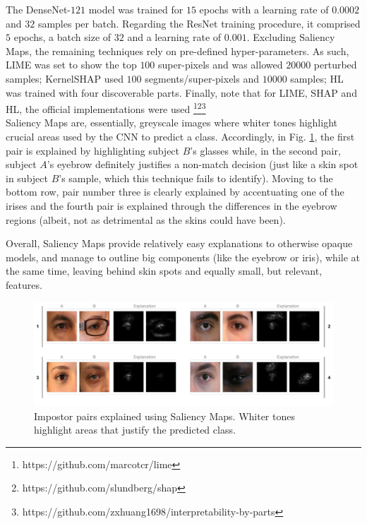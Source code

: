 The DenseNet-$121$ model was trained for $15$ epochs with a learning rate of $0.0002$ and $32$ samples per batch. Regarding the ResNet training procedure, it comprised $5$ epochs, a batch size of $32$ and a learning rate of $0.001$. Excluding Saliency Maps, the remaining techniques rely on pre-defined hyper-parameters. As such, \ac{LIME} was set to show the top $100$ super-pixels and was allowed $20000$ perturbed samples; Kernel\ac{SHAP} used $100$ segments/super-pixels and $10000$ samples; HL was trained with four discoverable parts. Finally, note that for \ac{LIME}, \ac{SHAP} and HL, the official implementations were used \footnote{https://github.com/marcotcr/lime}\footnote{https://github.com/slundberg/shap}\footnote{https://github.com/zxhuang1698/interpretability-by-parts}\\

Saliency Maps are, essentially, greyscale images where whiter tones highlight crucial areas used by the \ac{CNN} to predict a class. Accordingly, in Fig. \ref{fig:impostor_pairs_saliency_maps}, the first pair is explained by highlighting subject $B$'s glasses while, in the second pair, subject $A$'s eyebrow definitely justifies a non-match decision (just like a skin spot in subject $B$'s sample, which this technique fails to identify). Moving to the bottom row, pair number three is clearly explained by accentuating one of the irises and the fourth pair is explained through the differences in the eyebrow regions (albeit, not as detrimental as the skins could have been).

Overall, Saliency Maps provide relatively easy explanations to otherwise opaque models, and manage to outline big components (like the eyebrow or iris), while at the same time, leaving behind skin spots and equally small, but relevant, features.

\begin{figure}[H]
\centering
\includegraphics[width=410pt]{figures/figure_33.pdf}
\caption{Impostor pairs explained using Saliency Maps. Whiter tones highlight areas that justify the predicted class.}
\label{fig:impostor_pairs_saliency_maps}
\end{figure}

